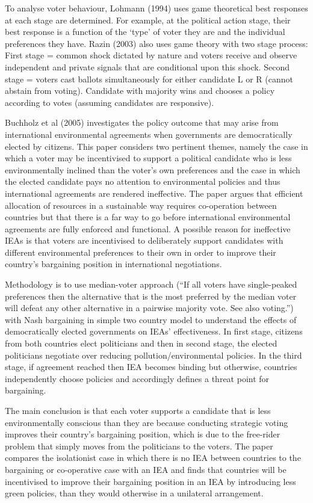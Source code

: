 \documentclass[11pt,preprint, authoryear]{elsarticle}
\numberwithin{equation}{section}
\numberwithin{figure}{section}
\numberwithin{table}{section}
\begin{document}
To analyse voter behaviour, Lohmann (1994) uses game theoretical best
responses at each stage are determined. For example, at the political
action stage, their best response is a function of the `type' of voter
they are and the individual preferences they have. Razin (2003) also
uses game theory with two stage process: First stage = common shock
dictated by nature and voters receive and observe independent and
private signals that are conditional upon this shock. Second stage =
voters cast ballots simultaneously for either candidate L or R (cannot
abstain from voting). Candidate with majority wins and chooses a policy
according to votes (assuming candidates are responsive).

Buchholz et al (2005) investigates the policy outcome that may arise
from international environmental agreements when governments are
democratically elected by citizens. This paper considers two pertinent
themes, namely the case in which a voter may be incentivised to support
a political candidate who is less environmentally inclined than the
voter's own preferences and the case in which the elected candidate pays
no attention to environmental policies and thus international agreements
are rendered ineffective. The paper argues that efficient allocation of
resources in a sustainable way requires co-operation between countries
but that there is a far way to go before international environmental
agreements are fully enforced and functional. A possible reason for
ineffective IEAs is that voters are incentivised to deliberately support
candidates with different environmental preferences to their own in
order to improve their country's bargaining position in international
negotiations.

Methodology is to use median-voter approach (``If all voters have
single-peaked preferences then the alternative that is the most
preferred by the median voter will defeat any other alternative in a
pairwise majority vote. See also voting.'') with Nash bargaining in
simple two country model to understand the effects of democratically
elected governments on IEAs' effectiveness. In first stage, citizens
from both countries elect politicians and then in second stage, the
elected politicians negotiate over reducing pollution/environmental
policies. In the third stage, if agreement reached then IEA becomes
binding but otherwise, countries independently choose policies and
accordingly defines a threat point for bargaining.

The main conclusion is that each voter supports a candidate that is less
environmentally conscious than they are because conducting strategic
voting improves their country's bargaining position, which is due to the
free-rider problem that simply moves from the politicians to the voters.
The paper compares the isolationist case in which there is no IEA
between countries to the bargaining or co-operative case with an IEA and
finds that countries will be incentivised to improve their bargaining
position in an IEA by introducing less green policies, than they would
otherwise in a unilateral arrangement.
\end{document}
